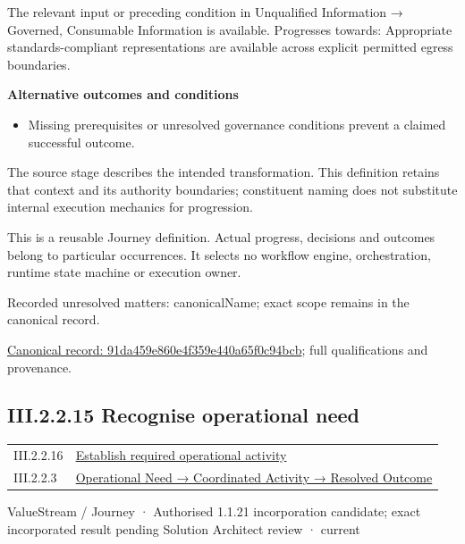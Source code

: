 The relevant input or preceding condition in Unqualified Information → Governed, Consumable Information is available. Progresses towards: Appropriate standards-compliant representations are available across explicit permitted egress boundaries.



\par\medskip\textbf{Alternative outcomes and conditions}\par


\begin{itemize}


\item Missing prerequisites or unresolved governance conditions prevent a claimed successful outcome.

\end{itemize}


The source stage describes the intended transformation. This definition retains that context and its authority boundaries; constituent naming does not substitute internal execution mechanics for progression.



This is a reusable Journey definition. Actual progress, decisions and outcomes belong to particular occurrences. It selects no workflow engine, orchestration, runtime state machine or execution owner.


{\small Recorded unresolved matters: canonicalName; exact scope remains in the canonical record.}\par
{\footnotesize \href{../../../../../../../continuum/strategy/value-stream/91da459e860e4f359e440a65f0c94bcb.md}{Canonical record: 91da459e860e4f359e440a65f0c94bcb}; full qualifications and provenance.}\par
\subsection*{III.2.2.15 Recognise operational need}
\label{navigation:III.2.2.15}

\begin{longtable}{p{.22\linewidth}p{.73\linewidth}}
III.2.2.16 & \hyperref[element:a3d8f16b4c69430e9024f002bdfb6c86]{Establish required operational activity} \\
III.2.2.3 & \hyperref[element:beea615ca7b34bbcbd0ad3a2a6ab2cff]{Operational Need → Coordinated Activity → Resolved Outcome} \\
\end{longtable}
\label{element:843798840da0410499908004459d1fbd}
{\small ValueStream / Journey · Authorised 1.1.21 incorporation candidate; exact incorporated result pending Solution Architect review · current}\par

